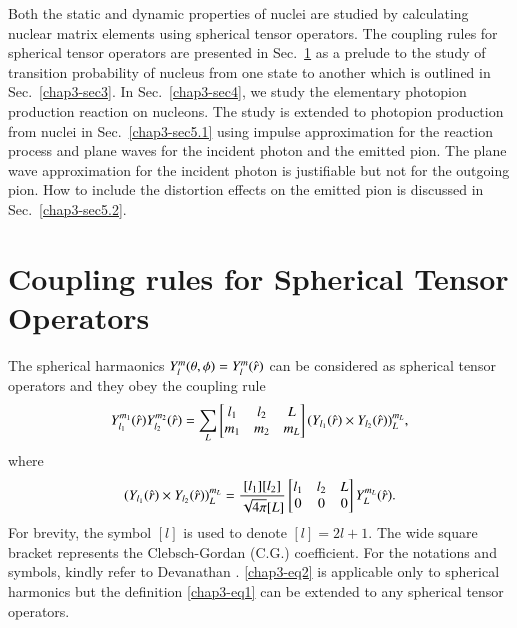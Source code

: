 Both the static and dynamic properties of nuclei are studied by calculating nuclear matrix elements using spherical tensor operators. The coupling rules for spherical tensor operators are presented in Sec.\ \ref{chap3-sec2} as a prelude to the study of transition probability of nucleus from one state to another which is outlined in Sec.\ \ref{chap3-sec3}. In Sec.\ \ref{chap3-sec4}, we study the elementary photopion production reaction on nucleons. The study is extended to photopion production from nuclei in Sec.\ \ref{chap3-sec5.1} using impulse approximation for the reaction process and plane waves for the incident photon and the emitted pion. The plane wave approximation for the incident photon is justifiable but not for the outgoing pion. How to include the distortion effects on the emitted pion is discussed in Sec.\ \ref{chap3-sec5.2}.

\section{Coupling rules for Spherical Tensor Operators} \label{chap3-sec2}

The spherical harmaonics $Y^m_l(\theta, \phi)= Y_l^m (\hat{{\boldmath  r}})$ can be considered as spherical tensor operators and they obey the coupling rule
\begin{equation}
Y_{l_1}^{m_1} (\hat{{\boldmath  r}}) Y_{l_2}^{m_2} (\hat{{\boldmath  r}}) = \sum_L 
	\begin{bmatrix}
		l_1 & l_2 & L\\
		m_1 &m_2  & m_L
	\end{bmatrix}
(Y_{l_1} (\hat{{\boldmath  r}}) \times Y_{l_2} (\hat{{\boldmath  r}}))^{m_L}_{L}, \label{chap3-eq1}
\end{equation}
where
\begin{equation}
(Y_{l_1}  (\hat{{\boldmath  r}})  \times Y_{l_2} (\hat{{\boldmath  r}}) )^{m_L}_{L} = \frac{[l_1][l_2]}{\sqrt{4\pi}[L]}
\begin{bmatrix}
l_1 & l_2 & L\\
0 & 0 & 0
\end{bmatrix}
Y_{L}^{m_L} (\hat{{\boldmath  r}}). \label{chap3-eq2} 
\end{equation}
For brevity, the symbol $[l]$ is used to denote $[l] = 2l + 1$. The wide square bracket represents the Clebsch-Gordan (C.G.) coefficient. For the notations and symbols, kindly refer to Devanathan \cite{chap3-key11,chap3-key12}. \eqref{chap3-eq2} is applicable only to spherical harmonics but the definition \eqref{chap3-eq1} can be extended to any spherical tensor operators.


